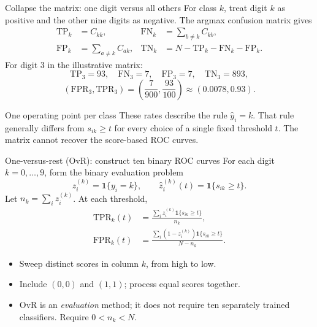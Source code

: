 \documentclass[aspectratio=169,11pt]{beamer}
\begin{document}
\begin{frame}{Collapse the matrix: one digit versus all others}
\small
For class $k$, treat digit $k$ as positive and the other nine digits as negative.
The argmax confusion matrix gives
\begin{align*}
 \mathrm{TP}_k&=C_{kk}, &
 \mathrm{FN}_k&=\sum_{b\ne k}C_{kb},\\
 \mathrm{FP}_k&=\sum_{a\ne k}C_{ak}, &
 \mathrm{TN}_k&=N-\mathrm{TP}_k-\mathrm{FN}_k-\mathrm{FP}_k.
\end{align*}
For digit $3$ in the illustrative matrix:
\[
 \mathrm{TP}_3=93,\quad \mathrm{FN}_3=7,\quad
 \mathrm{FP}_3=7,\quad \mathrm{TN}_3=893,
\]
\[
  (\mathrm{FPR}_3,\mathrm{TPR}_3)
  =\left(\frac7{900},\frac{93}{100}\right)
  \approx(0.0078,0.93).
\]
\begin{alertblock}{One operating point per class}
These rates describe the rule $\widehat y_i=k$. That rule generally differs
from $s_{ik}\ge t$ for every choice of a single fixed threshold $t$.
The matrix cannot recover the score-based ROC curves.
\end{alertblock}
\end{frame}

\begin{frame}{One-versus-rest (OvR): construct ten binary ROC curves}
For each digit $k=0,\ldots,9$, form the binary evaluation problem
\[
 z_i^{(k)}=\mathbf1\{y_i=k\},\qquad
 \widehat z_i^{(k)}(t)=\mathbf1\{s_{ik}\ge t\}.
\]
Let $n_k=\sum_i z_i^{(k)}$. At each threshold,
\begin{align*}
 \mathrm{TPR}_k(t)&=
 \frac{\sum_i z_i^{(k)}\mathbf1\{s_{ik}\ge t\}}{n_k},\\
 \mathrm{FPR}_k(t)&=
 \frac{\sum_i(1-z_i^{(k)})\mathbf1\{s_{ik}\ge t\}}{N-n_k}.
\end{align*}
\begin{itemize}
\item Sweep distinct scores in column $k$, from high to low.
\item Include $(0,0)$ and $(1,1)$; process equal scores together.
\item OvR is an \emph{evaluation} method; it does not require ten separately
      trained classifiers. Require $0<n_k<N$.
\end{itemize}
\end{frame}
\end{document}
